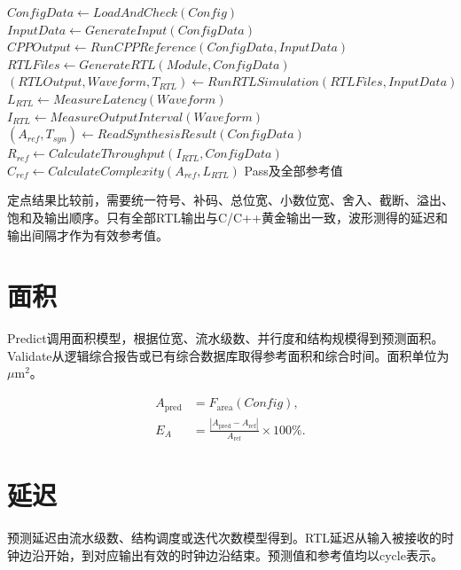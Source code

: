 \documentclass[a4paper,oneside,11pt]{ctexrep}
\begin{document}
\begin{algorithm}[H]
    \caption{Validate通用功能验证流程}
    $ConfigData \leftarrow LoadAndCheck(Config)$\;
    $InputData \leftarrow GenerateInput(ConfigData)$\;
    $CPPOutput \leftarrow RunCPPReference(ConfigData, InputData)$\;
    $RTLFiles \leftarrow GenerateRTL(Module, ConfigData)$\;
    $(RTLOutput, Waveform, T_{RTL}) \leftarrow RunRTLSimulation(RTLFiles, InputData)$\;
    $L_{RTL} \leftarrow MeasureLatency(Waveform)$\;
    $I_{RTL} \leftarrow MeasureOutputInterval(Waveform)$\;
    $(A_{ref},T_{syn}) \leftarrow ReadSynthesisResult(ConfigData)$\;
    $R_{ref} \leftarrow CalculateThroughput(I_{RTL},ConfigData)$\;
    $C_{ref} \leftarrow CalculateComplexity(A_{ref},L_{RTL})$\;
    \Return Pass及全部参考值\;
\end{algorithm}

定点结果比较前，需要统一符号、补码、总位宽、小数位宽、舍入、截断、溢出、饱和及输出顺序。只有全部RTL输出与C/C++黄金输出一致，波形测得的延迟和输出间隔才作为有效参考值。

\section{面积}

Predict调用面积模型，根据位宽、流水级数、并行度和结构规模得到预测面积。Validate从逻辑综合报告或已有综合数据库取得参考面积和综合时间。面积单位为$\mu\mathrm{m}^{2}$。

\begin{align}
    A_{\mathrm{pred}} &= F_{\mathrm{area}}(Config),\\
    E_A &= \frac{|A_{\mathrm{pred}}-A_{\mathrm{ref}}|}{A_{\mathrm{ref}}}\times100\%.
\end{align}

\section{延迟}

预测延迟由流水级数、结构调度或迭代次数模型得到。RTL延迟从输入被接收的时钟边沿开始，到对应输出有效的时钟边沿结束。预测值和参考值均以cycle表示。
\end{document}
